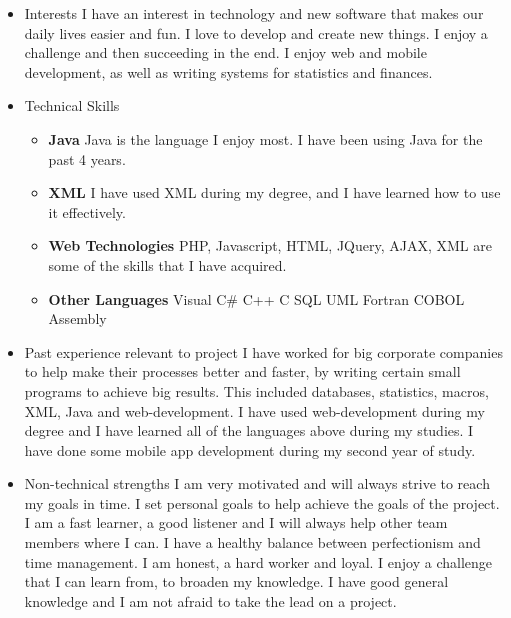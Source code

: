 \documentclass[12pt, oneside]{article}
\begin{document}
\begin{enumerate}
\begin{itemize}
			\item Interests\newline
				I have an interest in technology and new software that makes our daily lives easier and fun. I love to 						develop and create new things. I enjoy a challenge and then succeeding in the end. I enjoy web and 						mobile development, as well as writing systems for statistics and finances.
			\item Technical Skills\newline
				\begin{itemize}
				\item {\bf Java}\newline
					Java is the language I enjoy most. I have been using Java for the past 4 years.
				\item {\bf XML}\newline
					I have used XML during my degree, and I have learned how to use it effectively.
				\item {\bf Web Technologies}\newline
					PHP, Javascript, HTML, JQuery, AJAX, XML are some of the skills that I have acquired.
				\item {\bf Other Languages}\newline
					Visual C\#\newline
					C++\newline
					C\newline
					SQL\newline
					UML\newline	
					Fortran\newline
					COBOL\newline
					Assembly\newline
				\end{itemize}
			\item Past experience relevant to project\newline
				I have worked for big corporate companies to help make their processes better and faster, by writing 						certain small programs to achieve big results. This included databases, statistics, macros, XML, Java and 						web-development. I have used web-development during my degree and I have learned all of the 							languages above during my studies. I have done some mobile app development during my second year of study.
			\item Non-technical strengths\newline
				I am very motivated and will always strive to reach my goals in time. I set personal goals to help achieve 						the goals of the project. I am a fast learner, a good listener and I will always help other team members 						where I can. I have a healthy balance between perfectionism and time management. I am honest, a hard 						worker and loyal. I enjoy a challenge that I can learn from, to broaden my knowledge. I have good 							general knowledge and I am not afraid to take the lead on a project.

\end{itemize}
\end{enumerate}
\end{document}
